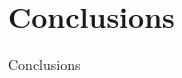 \documentclass{sig-alternate}
\begin{document}
\section{Conclusions}
Conclusions



%

%
%
\end{document}

